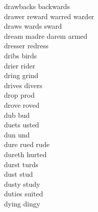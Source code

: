 drawbacks backwards\\
drawer reward warred warder\\
draws wards sward\\
dream madre darem armed\\
dresser redress\\
dribs birds\\
drier rider\\
dring grind\\
drives divers\\
drop prod\\
drove roved\\
dub bud\\
duets usted\\
dun und\\
dure rued rude\\
dureth hurted\\
durst turds\\
dust stud\\
dusty study\\
duties suited\\
dying dingy\\


